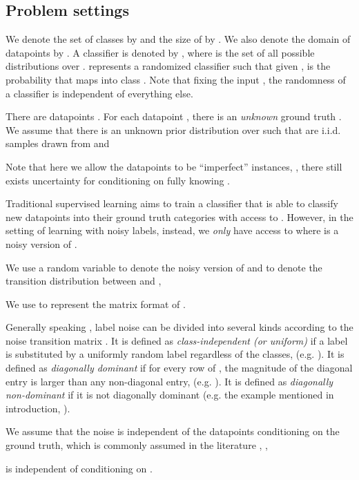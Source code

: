 \subsection{Problem settings}

We denote the set of classes by  and the size of  by . We also denote the domain of datapoints by . A classifier is denoted by , where  is the set of all possible distributions over .  represents a randomized classifier such that given ,  is the probability that  maps  into class . Note that fixing the input , the randomness of a classifier is independent of everything else.




There are  datapoints . For each datapoint , there is an \emph{unknown} ground truth . We assume that there is an unknown prior distribution  over  such that  are i.i.d. samples drawn from  and 


Note that here we allow the datapoints to be ``imperfect'' instances, \ie, there still exists uncertainty for  conditioning on fully knowing . 

Traditional supervised learning aims to train a classifier  that is able to classify new datapoints into their ground truth categories with access to . However, in the setting of learning with noisy labels, instead, we \emph{only} have access to  where  is a noisy version of . 

We use a random variable  to denote the noisy version of  and  to denote the transition distribution between  and , \ie 


We use  to represent the  matrix format of . 

Generally speaking \cite{patrini2017making, ghosh2017robust,  zhang2018generalized}, label noise can be divided into several kinds according to the noise transition matrix . It is defined as \emph{class-independent (or uniform)} if a label is substituted by a uniformly random label regardless of the classes, \ie  (e.g. ). It is defined as \emph{diagonally dominant} if for every row of  , the magnitude of the diagonal entry is larger than any non-diagonal entry, \ie  (e.g. ).
It is defined as \emph{diagonally non-dominant} if it is not diagonally dominant (e.g. the example mentioned in introduction, ). 

We assume that the noise is independent of the datapoints conditioning on the ground truth, which is commonly assumed in the literature \cite{patrini2017making, ghosh2017robust, zhang2018generalized}, \ie, 

\begin{assumption}
	 is independent of  conditioning on . 
\end{assumption}









